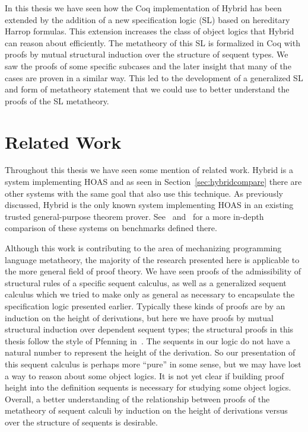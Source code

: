 In this thesis we have seen how the Coq implementation of Hybrid has been extended by the addition of a new specification logic (SL) based on hereditary Harrop formulas. This extension increases the class of object logics that Hybrid can reason about efficiently. The metatheory of this SL is formalized in Coq with proofs by mutual structural induction over the structure of sequent types. We saw the proofs of some specific subcases and the later insight that many of the cases are proven in a similar way. This led to the development of a generalized SL and form of metatheory statement that we could use to better understand the proofs of the SL metatheory.

\section{Related Work}

Throughout this thesis we have seen some mention of related work. Hybrid is a system implementing HOAS and as seen in Section~\ref{sec:hybridcompare} there are other systems with the same goal that also use this technique. As previously discussed, Hybrid is the only known system implementing HOAS in an existing trusted general-purpose theorem prover. See~\cite{FMP:CoRR15} and~\cite{FMP:JAR15} for a more in-depth comparison of these systems on benchmarks defined there.

Although this work is contributing to the area of mechanizing programming language metatheory, the majority of the research presented here is applicable to the more general field of proof theory. We have seen proofs of the admissibility of structural rules of a specific sequent calculus, as well as a generalized sequent calculus which we tried to make only as general as necessary to encapsulate the specification logic presented earlier. Typically these kinds of proofs are by an induction on the height of derivations, but here we have proofs by mutual structural induction over dependent sequent types; the structural proofs in this thesis follow the style of Pfenning in~\cite{Pfenning:IC00}. The sequents in our logic do not have a natural number to represent the height of the derivation. So our presentation of this sequent calculus is perhaps more ``pure'' in some sense, but we may have lost a way to reason about some object logics. It is not yet clear if building proof height into the definition sequents is necessary for studying some object logics. Overall, a better understanding of the relationship between proofs of the metatheory of sequent calculi by induction on the height of derivations versus over the structure of sequents is desirable.

